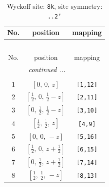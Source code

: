 \documentclass[fleqn,8pt]{jsarticle}
\begin{document}
\begin{longtable}{ccc}
\caption{Wyckoff site: {\tt 8k}, site symmetry: {\tt ..2'}}
 \\
 \hline \hline
No. & position & mapping \\ \hline \endfirsthead

\multicolumn{2}{l}{\tablename\ \thetable{}} \\
 \hline \hline
No. & position & mapping \\ \hline \endhead

 \hline \hline
\multicolumn{2}{r}{\footnotesize\it continued ...} \\ \endfoot

 \hline \hline
\multicolumn{2}{r}{} \\ \endlastfoot

1 & $\left[ 0,\, 0,\, z \right]$ & {\tt [1,12]} \\ \hline
2 & $\left[ \frac{1}{2},\, 0,\, \frac{1}{2} - z \right]$ & {\tt [2,11]} \\ \hline
3 & $\left[ 0,\, \frac{1}{2},\, \frac{1}{2} - z \right]$ & {\tt [3,10]} \\ \hline
4 & $\left[ \frac{1}{2},\, \frac{1}{2},\, z \right]$ & {\tt [4,9]} \\ \hline
5 & $\left[ 0,\, 0,\, - z \right]$ & {\tt [5,16]} \\ \hline
6 & $\left[ \frac{1}{2},\, 0,\, z + \frac{1}{2} \right]$ & {\tt [6,15]} \\ \hline
7 & $\left[ 0,\, \frac{1}{2},\, z + \frac{1}{2} \right]$ & {\tt [7,14]} \\ \hline
8 & $\left[ \frac{1}{2},\, \frac{1}{2},\, - z \right]$ & {\tt [8,13]} \\
\end{longtable}
\renewcommand{\arraystretch}{1.2}
\end{document}
